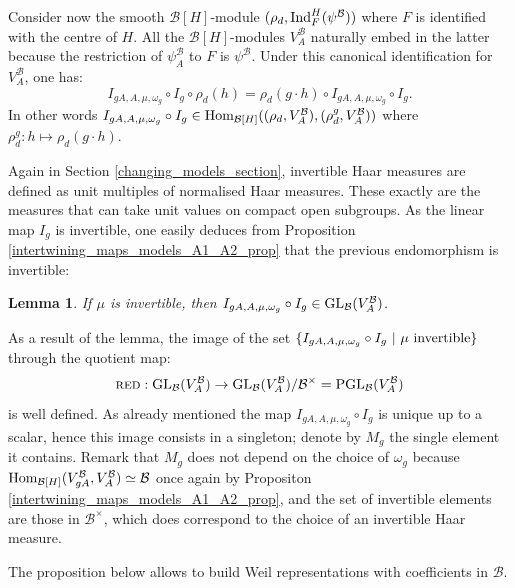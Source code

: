 \documentclass[11pt]{article}
\theoremstyle{plain}
\newtheorem{lem}[theo]{Lemma}
\theoremstyle{definition}
\theoremstyle{plain}
\theoremstyle{definition}
\theoremstyle{plain}
\begin{document}
Consider now the smooth $\mathcal{B}[H]$-module $(\rho_d,\textup{Ind}_F^H(\psi^\mathcal{B}))$ where $F$ is identified with the centre of $H$. All the $\mathcal{B}[H]$-modules $V_A^\mathcal{B}$ naturally embed in the latter because the restriction of $\psi_A^\mathcal{B}$ to $F$ is $\psi^\mathcal{B}$. Under this canonical identification for $V_A^\mathcal{B}$, one has:
$$I_{gA,A,\mu,\omega_g} \circ I_g \circ \rho_d(h) = \rho_d(g \cdot h) \circ I_{gA,A,\mu,\omega_g} \circ I_g.$$
In other words $I_{gA,A,\mu,\omega_g} \circ I_g \in \textup{Hom}_{\mathcal{B}[H]}((\rho_d,V_A^\mathcal{B}),(\rho_d^g,V_A^\mathcal{B}))$ where $\rho_d^g : h \mapsto \rho_d(g \cdot h)$.

Again in Section \ref{changing_models_section}, invertible Haar measures are defined as unit multiples of normalised Haar measures. These exactly are the measures that can take unit values on compact open subgroups. As the linear map $I_g$ is invertible, one easily deduces from Proposition \ref{intertwining_maps_models_A1_A2_prop} that the previous endomorphism is invertible:
\begin{lem} If $\mu$ is invertible, then $I_{gA,A,\mu,\omega_g} \circ I_g \in \textup{GL}_\mathcal{B}(V_A^\mathcal{B})$. \end{lem}

As a result of the lemma, the image of the set $\{ I_{gA,A,\mu,\omega_g} \circ I_g \ | \ \mu \textup{ invertible} \}$ through the quotient map:
$$\textup{\textsc{red}} : \textup{GL}_\mathcal{B} (V_A^\mathcal{B}) \to \textup{GL}_\mathcal{B} (V_A^\mathcal{B})/\mathcal{B}^\times = \textup{PGL}_\mathcal{B}(V_A^\mathcal{B})$$
is well defined. As already mentioned the map $I_{gA,A,\mu,\omega_g} \circ I_g$ is unique up to a scalar, hence this image consists in a singleton; denote by $M_g$ the single element it contains. Remark that $M_g$ does not depend on the choice of $\omega_g$ because $\textup{Hom}_{\mathcal{B}[H]}(V_{gA}^\mathcal{B},V_A^\mathcal{B}) \simeq \mathcal{B}$ once again by Propositon \ref{intertwining_maps_models_A1_A2_prop}, and the set of invertible elements are those in $\mathcal{B}^\times$, which does correspond to the choice of an invertible Haar measure.

The proposition below allows to build Weil representations with coefficients in $\mathcal{B}$.
\end{document}
